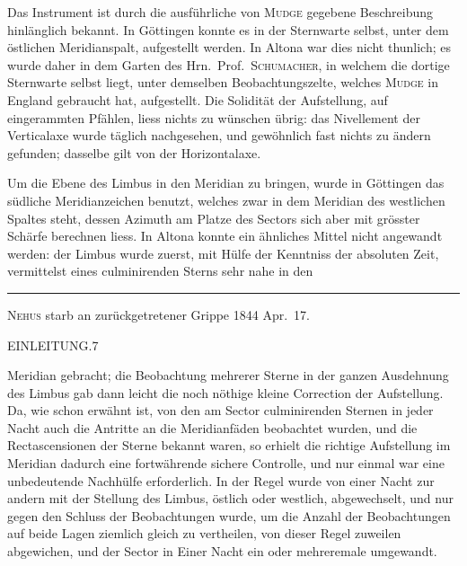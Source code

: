 Das Instrument ist durch die ausführliche von \textsc{Mudge} gegebene Beschreibung
hinlänglich bekannt. In Göttingen konnte es in der Sternwarte selbst,
unter dem östlichen Meridianspalt, aufgestellt werden. In Altona war dies
nicht thunlich; es wurde daher in dem Garten des Hrn.\ Prof.\ \textsc{Schumacher},
in welchem die dortige Sternwarte selbst liegt, unter demselben Beobachtungszelte,
welches \textsc{Mudge} in England gebraucht hat, aufgestellt. Die Solidität
der Aufstellung, auf eingerammten Pfählen, liess nichts zu wünschen übrig:
das Nivellement der Verticalaxe wurde täglich nachgesehen, und gewöhnlich
fast nichts zu ändern gefunden; dasselbe gilt von der Horizontalaxe.

Um die Ebene des Limbus in den Meridian zu bringen, wurde in Göttingen
das südliche Meridianzeichen benutzt, welches zwar in dem Meridian
des westlichen Spaltes steht, dessen Azimuth am Platze des Sectors sich aber
mit grösster Schärfe berechnen liess. In Altona konnte ein ähnliches Mittel
nicht angewandt werden: der Limbus wurde zuerst, mit Hülfe der Kenntniss
der absoluten Zeit, vermittelst eines culminirenden Sterns sehr nahe in den

\vfill\noindent\rule{.24\textwidth}{.4pt}\par
{\footnotesize{} \textsc{Nehus} starb an zurückgetretener Grippe 1844 Apr.\ 17.\par}

\clearpage
\noindent\mbox{}\hfill EINLEITUNG.\hfill 7\par
\noindent Meridian gebracht; die Beobachtung mehrerer Sterne in der ganzen Ausdehnung
des Limbus gab dann leicht die noch nöthige kleine Correction der
Aufstellung. Da, wie schon erwähnt ist, von den am Sector culminirenden
Sternen in jeder Nacht auch die Antritte an die Meridianfäden beobachtet
wurden, und die Rectascensionen der Sterne bekannt waren, so erhielt die
richtige Aufstellung im Meridian dadurch eine fortwährende sichere Controlle,
und nur einmal war eine unbedeutende Nachhülfe erforderlich. In der Regel
wurde von einer Nacht zur andern mit der Stellung des Limbus, östlich oder
westlich, abgewechselt, und nur gegen den Schluss der Beobachtungen wurde,
um die Anzahl der Beobachtungen auf beide Lagen ziemlich gleich zu vertheilen,
von dieser Regel zuweilen abgewichen, und der Sector in Einer Nacht
ein oder mehreremale umgewandt.

